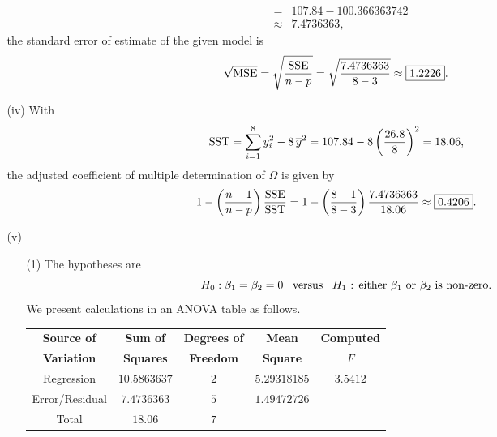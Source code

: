 \documentclass[11pt]{article}
\begin{document}
\begin{enumerate}
\begin{enumerate}
\begin{eqnarray*}
& = & 107.84 - 100.366363742 \\
& \approx & 7.4736363,
\end{eqnarray*}
the standard error of estimate of the given model is
$$
\sqrt{{\rm MSE}} = \sqrt{\frac{{\rm SSE}}{n - p}} = \sqrt{\frac{7.4736363}{8 - 3}} \approx \fbox{$1.2226$}.
$$
\item[(iv)]
With
$$
{\rm SST} = \sum_{i=1}^{8} y_i^2 - 8\,\overline{y}^2 = 107.84 - 8\left(\frac{26.8}{8}\right)^2 = 18.06,
$$
the adjusted coefficient of multiple determination of $\Omega$ is given by
$$
1 - \left(\frac{n-1}{n-p}\right)\frac{{\rm SSE}}{{\rm SST}} = 1 - \left(\frac{8 - 1}{8 - 3}\right)\frac{7.4736363}{18.06} \approx \fbox{0.4206}.
$$
\item[(v)]
\begin{enumerate}
\item[(1)]
The hypotheses are
$$
H_0 : \beta_1 = \beta_2 = 0 \ \ \, {\rm versus} \ \ \, \mbox{$H_1$ : either $\beta_1$ or $\beta_2$ is non-zero}.
$$
We present calculations in an ANOVA table as follows.

\begin{center}
\begin{tabular}{|ccccc|} \hline
{\bf Source of} & {\bf Sum of} & {\bf Degrees of} & {\bf Mean} & {\bf Computed} \\
{\bf Variation} & {\bf Squares} & {\bf Freedom} & {\bf Square} & {\bf $F$} \\ \hline\hline
Regression & $10.5863637$ & $2$ & $5.29318185$ & $3.5412$  \\
Error/Residual & $7.4736363$ & $5$ & $1.49472726$ & \\ \hline
Total & $18.06$ & $7$ & & \\ \hline
\end{tabular}
\end{center}


\end{enumerate}
\end{enumerate}
\end{enumerate}
\end{document}
